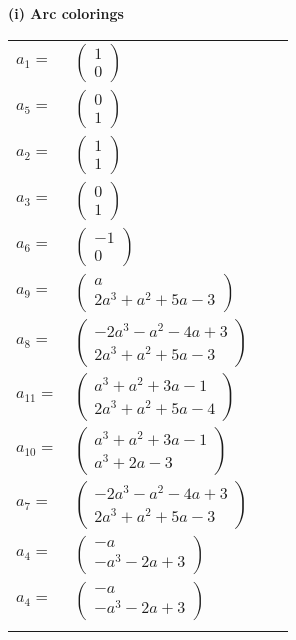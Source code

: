 \documentclass[1p]{elsarticle_modified}
\theoremstyle{definition}
\begin{document}
\flushleft \textbf{(i) Arc colorings}\\
\begin{tabular}{m{7pt} m{180pt} m{7pt} m{180pt} }
\flushright $a_{1}=$&$\begin{pmatrix}1\\0\end{pmatrix}$ \\
\flushright $a_{5}=$&$\begin{pmatrix}0\\1\end{pmatrix}$ \\
\flushright $a_{2}=$&$\begin{pmatrix}1\\1\end{pmatrix}$ \\
\flushright $a_{3}=$&$\begin{pmatrix}0\\1\end{pmatrix}$ \\
\flushright $a_{6}=$&$\begin{pmatrix}-1\\0\end{pmatrix}$ \\
\flushright $a_{9}=$&$\begin{pmatrix}a\\2 a^3+a^2+5 a-3\end{pmatrix}$ \\
\flushright $a_{8}=$&$\begin{pmatrix}-2 a^3- a^2-4 a+3\\2 a^3+a^2+5 a-3\end{pmatrix}$ \\
\flushright $a_{11}=$&$\begin{pmatrix}a^3+a^2+3 a-1\\2 a^3+a^2+5 a-4\end{pmatrix}$ \\
\flushright $a_{10}=$&$\begin{pmatrix}a^3+a^2+3 a-1\\a^3+2 a-3\end{pmatrix}$ \\
\flushright $a_{7}=$&$\begin{pmatrix}-2 a^3- a^2-4 a+3\\2 a^3+a^2+5 a-3\end{pmatrix}$ \\
\flushright $a_{4}=$&$\begin{pmatrix}- a\\- a^3-2 a+3\end{pmatrix}$\\ \flushright $a_{4}=$&$\begin{pmatrix}- a\\- a^3-2 a+3\end{pmatrix}$\\&\end{tabular}
\end{document}
